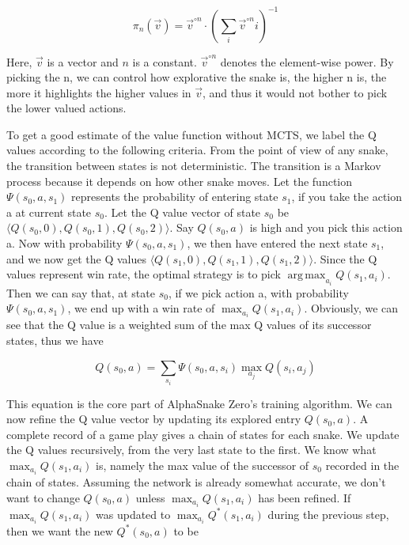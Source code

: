 ﻿\documentclass{article}
\DeclareMathOperator*{\argmax}{arg\,max}
\begin{document}
\begin{equation}
  \pi_n(\overrightarrow{v})=\overrightarrow{v}^{\circ n}\cdot(\sum\limits_i \overrightarrow{v}^{\circ n}i)^{-1}
\end{equation}

Here, $\overrightarrow{v}$ is a vector and $n$ is a constant.
$\overrightarrow{v}^{\circ n}$ denotes the element-wise power. By picking
the n, we can control how explorative the snake is, the higher n is, the
more it highlights the higher values in $\overrightarrow{v}$, and thus it
would not bother to pick the lower valued actions.

To get a good estimate of the value function without MCTS, we label the Q values
according to the following criteria. From the point of view of any snake, the
transition between states is not deterministic. The transition is a Markov
process because it depends on how other snake moves. Let the function
$\Psi(s_0,a,s_1)$ represents the probability of entering state $s_1$, if you
take the action a at current state $s_0$. Let the Q value vector of state $s_0$
be $\langle Q(s_0,0),Q(s_0,1),Q(s_0,2) \rangle$. Say $Q(s_0,a)$ is high and you
pick this action a. Now with probability $\Psi(s_0,a,s_1)$, we then have entered
the next state $s_1$, and we now get the Q values $\langle
  Q(s_1,0),Q(s_1,1),Q(s_1,2) \rangle$. Since the Q values represent win rate, the
optimal strategy is to pick $\argmax_{a_i}Q(s_1,a_i)$. Then we can say that, at
state $s_0$, if we pick action a, with probability $\Psi(s_0,a,s_1)$, we end up
with a win rate of $\max_{a_i}Q(s_1,a_i)$. Obviously, we can see that the Q
value is a weighted sum of the max Q values of its successor states, thus we
have

\begin{equation}
  Q(s_0, a) = \sum\limits_{s_i}\Psi(s_0,a,s_i)\max_{a_j} Q(s_i,a_j)
\end{equation}

This equation is the core part of AlphaSnake Zero’s training algorithm. We can
now refine the Q value vector by updating its explored entry $Q(s_0,a)$. A
complete record of a game play gives a chain of states for each snake. We update
the Q values recursively, from the very last state to the first. We know what
$\max_{a_i}Q(s_1,a_i)$ is, namely the max value of the successor of $s_0$ recorded
in the chain of states. Assuming the network is already somewhat accurate, we
don’t want to change $Q(s_0,a)$ unless $\max_{a_i}Q(s_1,a_i)$ has been refined. If
$\max_{a_i}Q(s_1,a_i)$ was updated to $\max_{a_i}Q^*(s_1,a_i)$ during the
previous step, then we want the new $Q^*(s_0,a)$ to be
\end{document}
